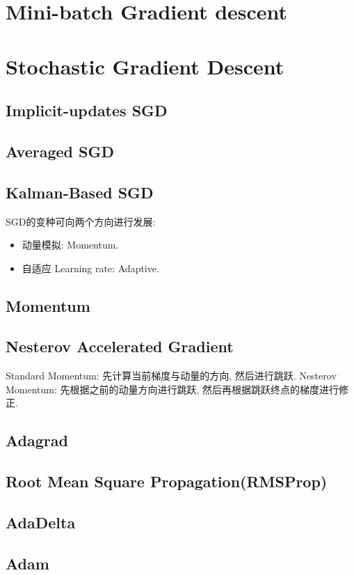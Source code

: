 \documentclass[oneside]{book}
\begin{document}
		\section{Mini-batch	Gradient descent}
		\section{Stochastic Gradient Descent}
			\subsection{Implicit-updates SGD}
			\subsection{Averaged SGD}
			\subsection{Kalman-Based SGD}
			SGD的变种可向两个方向进行发展:
			\begin{itemize}
				\item 动量模拟: Momentum.
				\item 自适应 Learning rate: Adaptive.
			\end{itemize}
			\subsection{Momentum}
			\subsection{Nesterov Accelerated Gradient \NovaMonoFont{[Momentum]}}
				Standard Momentum: 先计算当前梯度与动量的方向, 然后进行跳跃.
				Nesterov Momentum: 先根据之前的动量方向进行跳跃, 然后再根据跳跃终点的梯度进行修正.
				
			\subsection{Adagrad \NovaMonoFont{[Adaptive]}}
			\subsection{Root Mean Square Propagation(RMSProp) \NovaMonoFont{[Adaptive]}}
			\subsection{AdaDelta \NovaMonoFont{[Adaptive]}}
			\subsection{Adam }
\end{document}
